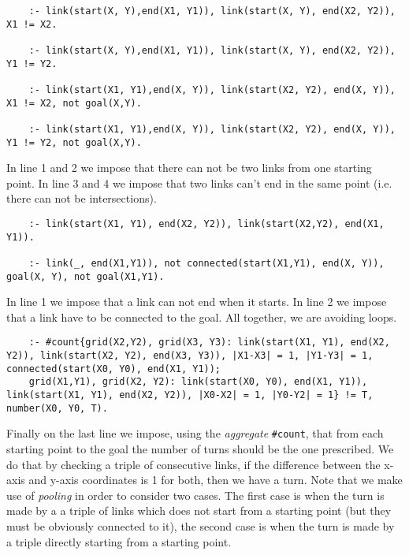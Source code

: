 \begin{verbatim}
    :- link(start(X, Y),end(X1, Y1)), link(start(X, Y), end(X2, Y2)), X1 != X2. 

    :- link(start(X, Y),end(X1, Y1)), link(start(X, Y), end(X2, Y2)), Y1 != Y2. 
    
    :- link(start(X1, Y1),end(X, Y)), link(start(X2, Y2), end(X, Y)), X1 != X2, not goal(X,Y). 
    
    :- link(start(X1, Y1),end(X, Y)), link(start(X2, Y2), end(X, Y)), Y1 != Y2, not goal(X,Y). 
\end{verbatim}

In line 1 and 2 we impose that there can not be two links from one starting point. In line 3 and 4 we impose that two links can't end in the same point (i.e. there can not be intersections).
\begin{verbatim}
    :- link(start(X1, Y1), end(X2, Y2)), link(start(X2,Y2), end(X1, Y1)).

    :- link(_, end(X1,Y1)), not connected(start(X1,Y1), end(X, Y)), goal(X, Y), not goal(X1,Y1). 
\end{verbatim}

In line 1 we  impose that a link can not end when it starts. In line 2 we impose that a link have to be connected to the goal. All together, we are avoiding loops.

\begin{verbatim}
    :- #count{grid(X2,Y2), grid(X3, Y3): link(start(X1, Y1), end(X2, Y2)), link(start(X2, Y2), end(X3, Y3)), |X1-X3| = 1, |Y1-Y3| = 1, connected(start(X0, Y0), end(X1, Y1));
    grid(X1,Y1), grid(X2, Y2): link(start(X0, Y0), end(X1, Y1)), link(start(X1, Y1), end(X2, Y2)), |X0-X2| = 1, |Y0-Y2| = 1} != T, number(X0, Y0, T).
\end{verbatim}

Finally on the last line we impose, using the \emph{aggregate} \texttt{#count}, that from each starting point to the goal the number of turns should be the one prescribed. We do that by checking a triple of consecutive links, if the difference between the x-axis and y-axis coordinates is 1 for both, then we have a turn.
 Note that we make use of \emph{pooling} in order to consider two cases. The first case is when the turn is made by a a triple of links which does not start from a starting point (but they must be obviously connected to it), the second case is when the turn is made by a triple directly starting from a starting point.

